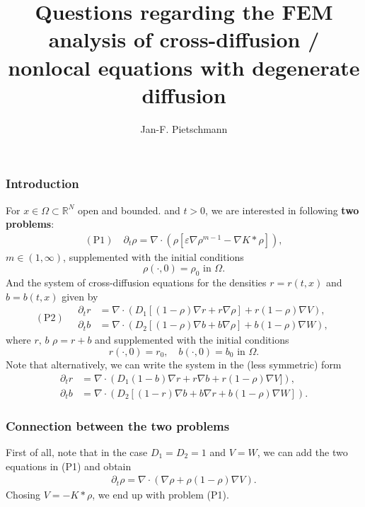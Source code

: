 \documentclass[11pt,a4paper]{article}
\title{Questions regarding the FEM analysis of cross-diffusion / nonlocal equations with degenerate diffusion}
\author{Jan-F. Pietschmann}
\def\eps{\varepsilon}
\def\RR{\mathbb{R}}
\theoremstyle{definition}
\numberwithin{equation}{section}
\begin{document}
\maketitle
\subsubsection*{Introduction}
For $x\in\Omega\subset \RR^N$ open and bounded. and $t>0$, we are interested in following \textbf{two problems}:
\begin{align}\label{eq:porousfem}
\mathrm{(P1)}\quad\partial_t \rho = \nabla\cdot (\rho [ \eps\nabla \rho^{m-1} - \nabla K \ast \rho]),
\end{align}
$m\in (1,\infty)$, supplemented with the initial conditions
\begin{equation}
	\rho(\cdot,0) = \rho_0\text{ in } \Omega.
\end{equation}
And the system of cross-diffusion equations for the densities $r=r(t,x)$ and $b=b(t,x)$ given by
\begin{equation*}
    \mathrm{(P2)}\quad\begin{aligned}
 \partial_t r &= \nabla \cdot (D_1[(1-\rho)\nabla r + r \nabla \rho ] + r(1-\rho)\nabla V),\\
\partial_t b &= \nabla \cdot (D_2[ (1-\rho)\nabla b + b \nabla \rho ] + b(1-\rho)\nabla W),   \end{aligned}    
\end{equation*}
where $r,\,b$  $\rho = r+b$ and supplemented with the initial conditions
\begin{equation}
	r(\cdot,0) = r_0, \quad b(\cdot,0) = b_0 \text{ in } \Omega.
\end{equation}
Note that alternatively, we can write the system in the (less symmetric) form
 \begin{equation}
    \begin{aligned}
 \partial_t r &= \nabla \cdot (D_1(1-b)\nabla r + r \nabla b + r(1-\rho)\nabla V]),\\
 \partial_t b &= \nabla \cdot (D_2[ (1-r)\nabla b + b \nabla r + b(1-\rho)\nabla W]).
\end{aligned}    
\end{equation}
\subsubsection*{Connection between the two problems}
First of all, note that in the case $D_1=D_2=1$ and $V=W$, we can add the two equations in (P1) and obtain
\begin{align}\label{eq:sum}
 \partial_t \rho = \nabla\cdot (\nabla \rho + \rho(1-\rho)\nabla V).
\end{align}
Chosing $V = -K \ast \rho$, we end up with problem (P1).
\end{document}
